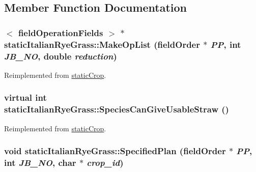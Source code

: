 \subsection{Member Function Documentation}
\hypertarget{classstatic_italian_rye_grass_ad26f7e4790a4eb3235a8d6f56840c826}{
\subsubsection[{MakeOpList}]{$<$ {\bf fieldOperationFields} $>$ $\ast$ staticItalianRyeGrass::MakeOpList ({\bf fieldOrder} $\ast$ {\em PP}, \/  int {\em JB\_\-NO}, \/  double {\em reduction})}}
\label{classstatic_italian_rye_grass_ad26f7e4790a4eb3235a8d6f56840c826}


Reimplemented from \hyperlink{classstatic_crop_a9b67ef1ae531a3afb32b63a4aeb5916b}{staticCrop}.\hypertarget{classstatic_italian_rye_grass_a9d5e2ec0dc3a216104a37343dd69cc75}{
\subsubsection[{SpeciesCanGiveUsableStraw}]{\setlength{\rightskip}{0pt plus 5cm}virtual int staticItalianRyeGrass::SpeciesCanGiveUsableStraw ()}}
\label{classstatic_italian_rye_grass_a9d5e2ec0dc3a216104a37343dd69cc75}


Reimplemented from \hyperlink{classstatic_crop_ab7763e4e6a0b9eff1788cb86ebad8170}{staticCrop}.\hypertarget{classstatic_italian_rye_grass_a059473a7b43838cbd8c0d125f0533e32}{
\subsubsection[{SpecifiedPlan}]{\setlength{\rightskip}{0pt plus 5cm}void staticItalianRyeGrass::SpecifiedPlan ({\bf fieldOrder} $\ast$ {\em PP}, \/  int {\em JB\_\-NO}, \/  char $\ast$ {\em crop\_\-id})}}
\label{classstatic_italian_rye_grass_a059473a7b43838cbd8c0d125f0533e32}


